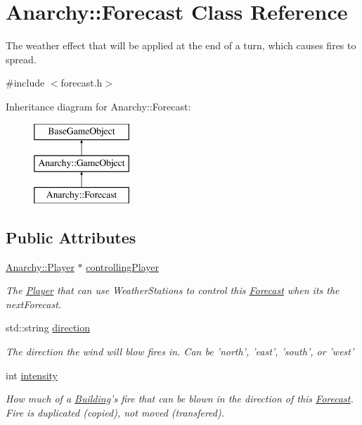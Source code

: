 \hypertarget{classAnarchy_1_1Forecast}{\section{Anarchy\-:\-:Forecast Class Reference}
\label{classAnarchy_1_1Forecast}
}


The weather effect that will be applied at the end of a turn, which causes fires to spread.  




{\ttfamily \#include $<$forecast.\-h$>$}

Inheritance diagram for Anarchy\-:\-:Forecast\-:\begin{figure}[H]
\begin{center}
\leavevmode
\includegraphics[height=3.000000cm]{classAnarchy_1_1Forecast}
\end{center}
\end{figure}
\subsection*{Public Attributes}
\begin{DoxyCompactItemize}
\item 
\hyperlink{classAnarchy_1_1Player}{Anarchy\-::\-Player} $\ast$ \hyperlink{classAnarchy_1_1Forecast_a3e6c133fea0591d299943a5e3216211d}{controlling\-Player}
\begin{DoxyCompactList}\small\item\em The \hyperlink{classAnarchy_1_1Player}{Player} that can use Weather\-Stations to control this \hyperlink{classAnarchy_1_1Forecast}{Forecast} when its the next\-Forecast. \end{DoxyCompactList}\item 
std\-::string \hyperlink{classAnarchy_1_1Forecast_ae1e9bbacab6d18bbec3cbb0e5a33756b}{direction}
\begin{DoxyCompactList}\small\item\em The direction the wind will blow fires in. Can be 'north', 'east', 'south', or 'west' \end{DoxyCompactList}\item 
int \hyperlink{classAnarchy_1_1Forecast_a18d05c207ab1e31e06ecdc5781f50499}{intensity}
\begin{DoxyCompactList}\small\item\em How much of a \hyperlink{classAnarchy_1_1Building}{Building}'s fire that can be blown in the direction of this \hyperlink{classAnarchy_1_1Forecast}{Forecast}. Fire is duplicated (copied), not moved (transfered). \end{DoxyCompactList}\end{DoxyCompactItemize}
